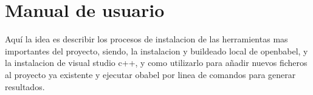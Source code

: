 \chapter{Manual de usuario}
\label{apend:manual}

Aquí la idea es describir los procesos de instalacion de las herramientas mas importantes del proyecto, siendo, la instalacion y buildeado local de openbabel, y la instalacion de visual studio c++, y como utilizarlo para añadir nuevos ficheros al proyecto ya existente y ejecutar obabel por linea de comandos para generar resultados.

